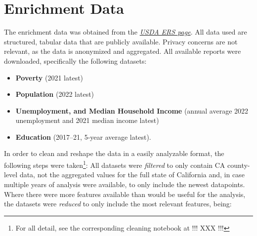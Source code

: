 

\section{Enrichment Data}\label{sec:Enrichment_Data}


The enrichment data was obtained from the \textit{\href{https://www.ers.usda.gov/data-products/county-level-data-sets/}{USDA ERS page}}. All data used are structured, tabular data that are publicly available. Privacy concerns are not relevant, as the data is anonymized and aggregated. All available reports were downloaded, specifically the following datasets:

\begin{itemize}
    \item \textbf{Poverty} (2021 latest)
    \item \textbf{Population} (2022 latest)
    \item \textbf{Unemployment, and Median Household Income} (annual average 2022 unemployment and 2021 median income latest)
    \item \textbf{Education} (2017–21, 5-year average latest).
\end{itemize}

In order to clean and reshape the data in a easily analyzable format, the following steps were taken\footnote{For all detail, see the corresponding cleaning notebook at !!! XXX !!!}:
All datasets were \textit{filtered} to only contain CA county-level data, not the aggregated values for the full state of California and, in case multiple years of analysis were available, to only include the newest datapoints. 
Where there were more features available than would be useful for the analysis, the datasets were \textit{reduced} to only include the most relevant features, being:

